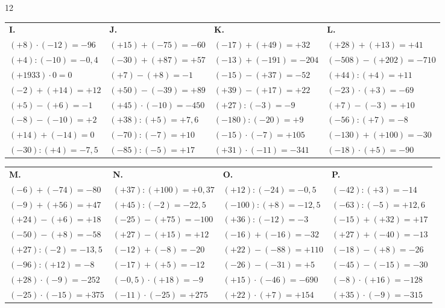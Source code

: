 \begin{solution}{12}
\bigskip
\begin{tabularx}{\linewidth}{*{4}{X}}
\textbf{I.} & \textbf{J.} & \textbf{K.} & \textbf{L.} \\
$(+8)\cdot(-12)=-96$  & $(+15)+(-75)=-60$    & $(-17)+(+49)=+32$    & $(+28)+(+13)=+41$     \\
$(+4):(-10)=-0{,}4$   & $(-30)+(+87)=+57$    & $(-13)+(-191)=-204$  & $(-508)-(+202)=-710$  \\
$(+1933)\cdot 0=0$    & $(+7)-(+8)=-1$       & $(-15)-(+37)=-52$    & $(+44):(+4)=+11$      \\
$(-2)+(+14)=+12$      & $(+50)-(-39)=+89$    & $(+39)-(+17)=+22$    & $(-23)\cdot(+3)=-69$  \\
$(+5)-(+6)=-1$        & $(+45)\cdot(-10)=-450$& $(+27):(-3)=-9$     & $(+7)-(-3)=+10$       \\
$(-8)-(-10)=+2$       & $(+38):(+5)=+7{,}6$  & $(-180):(-20)=+9$    & $(-56):(+7)=-8$       \\
$(+14)+(-14)=0$       & $(-70):(-7)=+10$     & $(-15)\cdot(-7)=+105$& $(-130)+(+100)=-30$   \\
$(-30):(+4)=-7{,}5$   & $(-85):(-5)=+17$     & $(+31)\cdot(-11)=-341$& $(-18)\cdot(+5)=-90$ \\
\end{tabularx}

\bigskip
\begin{tabularx}{\linewidth}{*{4}{X}}
\textbf{M.} & \textbf{N.} & \textbf{O.} & \textbf{P.} \\
$(-6)+(-74)=-80$      & $(+37):(+100)=+0{,}37$ & $(+12):(-24)=-0{,}5$  & $(-42):(+3)=-14$      \\
$(-9)+(+56)=+47$      & $(+45):(-2)=-22{,}5$   & $(-100):(+8)=-12{,}5$ & $(-63):(-5)=+12{,}6$  \\
$(+24)-(+6)=+18$      & $(-25)-(+75)=-100$     & $(+36):(-12)=-3$      & $(-15)+(+32)=+17$     \\
$(-50)-(+8)=-58$      & $(+27)-(+15)=+12$      & $(-16)+(-16)=-32$     & $(+27)+(-40)=-13$     \\
$(+27):(-2)=-13{,}5$  & $(-12)+(-8)=-20$       & $(+22)-(-88)=+110$    & $(-18)-(+8)=-26$      \\
$(-96):(+12)=-8$      & $(-17)+(+5)=-12$       & $(-26)-(-31)=+5$      & $(-45)-(-15)=-30$     \\
$(+28)\cdot(-9)=-252$ & $(-0{,}5)\cdot(+18)=-9$& $(+15)\cdot(-46)=-690$& $(-8)\cdot(+16)=-128$ \\
$(-25)\cdot(-15)=+375$& $(-11)\cdot(-25)=+275$ & $(+22)\cdot(+7)=+154$ & $(+35)\cdot(-9)=-315$ \\
\end{tabularx}

\end{solution}

